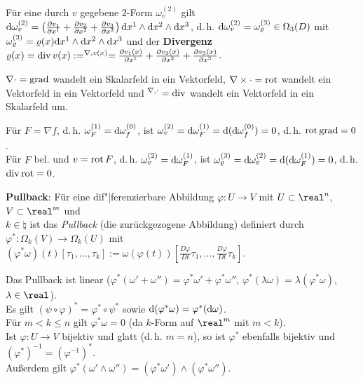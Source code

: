 Für eine durch $v$ gegebene $2$-Form $\omega_v^{(2)}$ gilt
$\d \omega_v^{(2)} = \left(\frac{\partial v_1}{\partial x^1} +
\frac{\partial v_2}{\partial x^2} + \frac{\partial v_3}{\partial x^3}\right)
\d x^1 \land \d x^2 \land \d x^3$, d.\,h.
$\d \omega_v^{(2)} = \omega_\varrho^{(3)} \in \Omega_3(D)$ mit
$\omega_\varrho^{(3)} = \varrho(x) \d x^1 \land \d x^2 \land \d x^3$ und
der \textbf{Divergenz} \\
$\varrho(x) = \div v(x) := \sp{\nabla, v(x)} =
\frac{\partial v_1(x)}{\partial x^1} +
\frac{\partial v_2(x)}{\partial x^2} + \frac{\partial v_3(x)}{\partial x^3}$.

$\nabla \cdot = \grad$ wandelt ein Skalarfeld in ein Vektorfeld,
$\nabla \times \cdot = \rot$ wandelt ein Vektorfeld in ein Vektorfeld und
$\sp{\nabla, \cdot} = \div$ wandelt ein Vektorfeld in ein Skalarfeld um.

Für $F = \nabla f$, d.\,h. $\omega_F^{(1)} = \d \omega_f^{(0)}$, ist
$\omega_v^{(2)} = \d \omega_F^{(1)} = \d (\d \omega_f^{(0)}) = 0$, d.\,h.
\textbf{$\rot \grad = 0$}. \\
Für $F$ bel. und $v = \rot F$, d.\,h. $\omega_v^{(2)} = \d \omega_F^{(1)}$,
ist $\omega_\varrho^{(3)} = \d \omega_v^{(2)} = \d (\d \omega_F^{(1)}) = 0$,
d.\,h. \textbf{$\div \rot = 0$}.

\linie

\textbf{Pullback}:
Für eine dif"|ferenzierbare Abbildung $\varphi\colon U \rightarrow V$ mit
$U \subset \real^n$, $V \subset \real^m$ und \\
$k \in \natural$
ist das \emph{Pullback} (die zurückgezogene Abbildung) definiert durch \\
$\varphi^\ast\colon \Omega_k(V) \rightarrow \Omega_k(U)$ mit
$(\varphi^\ast \omega)(t)[\tau_1, \dotsc, \tau_k] :=
\omega(\varphi(t))\left[\frac{D\varphi}{Dt} \tau_1, \dotsc,
\frac{D\varphi}{Dt} \tau_k\right]$.

Das Pullback ist linear ($\varphi^\ast(\omega' + \omega'') =
\varphi^\ast \omega' + \varphi^\ast \omega''$,
$\varphi^\ast (\lambda \omega) = \lambda (\varphi^\ast \omega)$,
$\lambda \in \real$). \\
Es gilt $(\psi \circ \varphi)^\ast = \varphi^\ast \circ \psi^\ast$
sowie $\d (\varphi^\ast \omega) = \varphi^\ast (\d \omega)$. \\
Für $m < k \le n$ gilt $\varphi^\ast \omega = 0$
(da $k$-Form auf $\real^m$ mit $m < k$). \\
Ist $\varphi\colon U \rightarrow V$ bijektiv und glatt (d.\,h. $m = n$),
so ist $\varphi^\ast$ ebenfalls bijektiv und
$(\varphi^\ast)^{-1} = (\varphi^{-1})^\ast$. \\
Außerdem gilt $\varphi^\ast(\omega' \land \omega'') =
(\varphi^\ast \omega') \land (\varphi^\ast \omega'')$.

